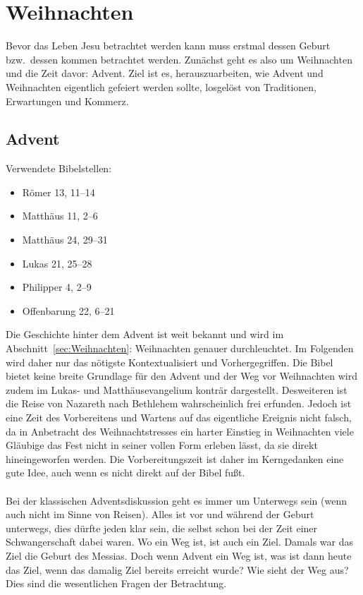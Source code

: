 \chapter{Weihnachten}
Bevor das Leben Jesu betrachtet werden kann muss erstmal dessen Geburt bzw.\ dessen kommen betrachtet werden. Zunächst geht es also um Weihnachten und die Zeit davor: Advent. Ziel ist es, herauszuarbeiten, wie Advent und Weihnachten eigentlich gefeiert werden sollte, losgelöst von Traditionen, Erwartungen und Kommerz. 

\section{Advent}\label{sec:Advent}
Verwendete Bibelstellen:
\begin{itemize}
\item Römer 13, 11--14
\item Matthäus 11, 2--6
\item Matthäus 24, 29--31
\item Lukas 21, 25--28
\item Philipper 4, 2--9
\item Offenbarung 22, 6--21
\end{itemize}
Die Geschichte hinter dem Advent ist weit bekannt und wird im Abschnitt\ \ref{sec:Weihnachten}: Weihnachten genauer durchleuchtet. Im Folgenden wird daher nur das nötigste Kontextualisiert und Vorhergegriffen. Die Bibel bietet keine breite Grundlage für den Advent und der Weg vor Weihnachten wird zudem im Lukas- und Matthäusevangelium konträr dargestellt. Desweiteren ist die Reise von Nazareth nach Bethlehem wahrscheinlich frei erfunden. Jedoch ist eine Zeit des Vorbereitens und Wartens auf das eigentliche Ereignis nicht falsch, da in Anbetracht des Weihnachtstresses ein harter Einstieg in Weihnachten viele Gläubige das Fest nicht in seiner vollen Form erleben lässt, da sie direkt hineingeworfen werden. Die Vorbereitungszeit ist daher im Kerngedanken eine gute Idee, auch wenn es nicht direkt auf der Bibel fußt.
\\~\\
Bei der klassischen Adventsdiskussion geht es immer um Unterwegs sein (wenn auch nicht im Sinne von Reisen). Alles ist vor und während der Geburt unterwegs, dies dürfte jeden klar sein, die selbst schon bei der Zeit einer Schwangerschaft dabei waren. Wo ein Weg ist, ist auch ein Ziel. Damals war das Ziel die Geburt des Messias. Doch wenn Advent ein Weg ist, was ist dann heute das Ziel, wenn das damalig Ziel bereits erreicht wurde? Wie sieht der Weg aus? Dies sind die wesentlichen Fragen der Betrachtung.



